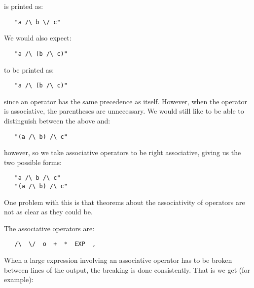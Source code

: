\noindent
is printed as:

\begin{small}\begin{verbatim}
   "a /\ b \/ c"
\end{verbatim}\end{small}

\noindent
We would also expect:

\begin{small}\begin{verbatim}
   "a /\ (b /\ c)"
\end{verbatim}\end{small}

\noindent
to be printed as:

\begin{small}\begin{verbatim}
   "a /\ (b /\ c)"
\end{verbatim}\end{small}

\noindent
since an operator has the same precedence as itself. However, when the
operator is associative, the parentheses are unnecessary. We would still like
to be able to distinguish between the above and:

\begin{small}\begin{verbatim}
   "(a /\ b) /\ c"
\end{verbatim}\end{small}

\noindent
however, so we take associative operators to be right associative, giving us
the two possible forms:

\begin{small}\begin{verbatim}
   "a /\ b /\ c"
   "(a /\ b) /\ c"
\end{verbatim}\end{small}

\noindent
One problem with this is that theorems about the associativity of operators
are not as clear as they could be.

The associative operators are:

\begin{small}\begin{verbatim}
   /\  \/  o  +  *  EXP  ,
\end{verbatim}\end{small}

\noindent
When a large expression involving an associative operator has to be broken
between lines of the output, the breaking is done consistently. That is we
get (for example):

